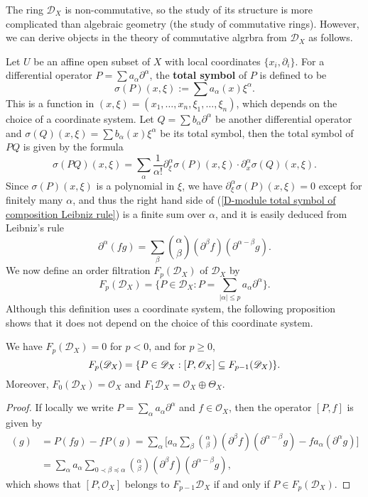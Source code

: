 The ring $\mathscr{D}_X$ is non-commutative, so the study of its structure is more complicated than algebraic geometry (the study of commutative rings). However, we can derive objects in the theory of commutative algrbra from $\mathscr{D}_X$ as follows.\par
Let $U$ be an affine open subset of $X$ with local coordinates $\{x_i,\partial_i\}$. For a differential operator $P=\sum a_\alpha\partial^\alpha$, the \textbf{total symbol} of $P$ is defined to be
\[\sigma(P)(x,\xi):=\sum a_\alpha(x)\xi^\alpha.\]
This is a function in $(x,\xi)=(x_1,\dots,x_n,\xi_1,\dots,\xi_n)$, which depends on the choice of a coordinate system. Let $Q=\sum b_\alpha \partial^\alpha$ be another differential operator and $\sigma(Q)(x,\xi)=\sum b_\alpha(x)\xi^\alpha$ be its total symbol, then the total symbol of $PQ$ is given by the formula
\begin{equation}\label{D-module total symbol of composition Leibniz rule}
\sigma(PQ)(x,\xi)=\sum_\alpha\frac{1}{\alpha!}\partial^\alpha_\xi\sigma(P)(x,\xi)\cdot\partial^\alpha_x\sigma(Q)(x,\xi).
\end{equation}
Since $\sigma(P)(x,\xi)$ is a polynomial in $\xi$, we have $\partial^\alpha_\xi\sigma(P)(x,\xi)=0$ except for finitely many $\alpha$, and thus the right hand side of (\ref{D-module total symbol of composition Leibniz rule}) is a finite sum over $\alpha$, and it is easily deduced from Leibniz's rule
\begin{equation}\label{D-module higher differential Leibniz rule}
\partial^\alpha(fg)=\sum_\beta\binom{\alpha}{\beta}(\partial^\beta f)(\partial^{\alpha-\beta}g).
\end{equation}
We now define an order filtration $F_p(\mathscr{D}_X)$ of $\mathscr{D}_X$ by
\[F_p(\mathscr{D}_X)=\{P\in\mathscr{D}_X:\text{$P=\sum_{|\alpha|\leq p}a_\alpha \partial^\alpha$}\}.\]
Although this definition uses a coordinate system, the following proposition shows that it does not depend on the choice of this coordinate system.
\begin{proposition}\label{D-module ring D_X filtration prop}
We have $F_p(\mathscr{D}_X)=0$ for $p<0$, and for $p\geq 0$, 
\[F_p(\mathscr{D}_X)=\{P\in\mathscr{D}_X:[P,\mathscr{O}_X]\subseteq F_{p-1}(\mathscr{D}_X)\}.\]
Moreover, $F_0(\mathscr{D}_X)=\mathscr{O}_X$ and $F_1\mathscr{D}_X=\mathscr{O}_X\oplus\Theta_X$.
\end{proposition}
\begin{proof}
If locally we write $P=\sum_\alpha a_\alpha\partial^\alpha$ and $f\in\mathscr{O}_X$, then the operator $[P,f]$ is given by
\begin{align*}
[P,f](g)&=P(fg)-fP(g)=\sum_\alpha\Big[a_\alpha\sum_\beta\binom{\alpha}{\beta}(\partial^\beta f)(\partial^{\alpha-\beta}g)-fa_\alpha(\partial^\alpha g)\Big]\\
&=\sum_{\alpha}a_\alpha\sum_{0\prec \beta\preceq\alpha}\binom{\alpha}{\beta}(\partial^\beta f)(\partial^{\alpha-\beta}g),
\end{align*}
which shows that $[P,\mathscr{O}_X]$ belongs to $F_{p-1}\mathscr{D}_X$ if and only if $P\in F_p(\mathscr{D}_X)$.
\end{proof} 

